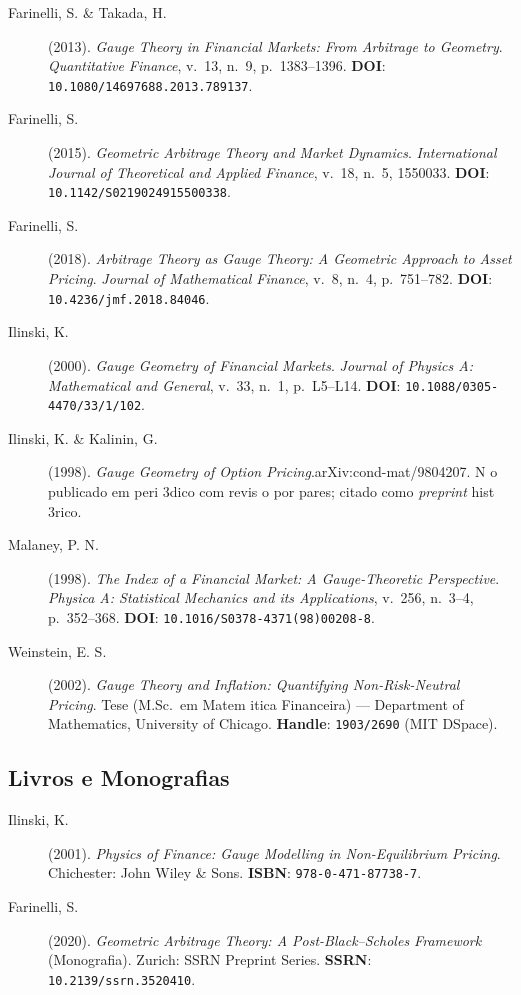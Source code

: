 \begin{description}
\item[Farinelli, S. \& Takada, H.] (2013). \textit{Gauge Theory in Financial Markets: From Arbitrage to Geometry}. \textit{Quantitative Finance}, v.~13, n.~9, p.~1383--1396. \textbf{DOI}: \texttt{10.1080/14697688.2013.789137}.

\item[Farinelli, S.] (2015). \textit{Geometric Arbitrage Theory and Market Dynamics}. \textit{International Journal of Theoretical and Applied Finance}, v.~18, n.~5, 1550033. \textbf{DOI}: \texttt{10.1142/S0219024915500338}.

\item[Farinelli, S.] (2018). \textit{Arbitrage Theory as Gauge Theory: A Geometric Approach to Asset Pricing}. \textit{Journal of Mathematical Finance}, v.~8, n.~4, p.~751--782. \textbf{DOI}: \texttt{10.4236/jmf.2018.84046}.

\item[Ilinski, K.] (2000). \textit{Gauge Geometry of Financial Markets}. \textit{Journal of Physics A: Mathematical and General}, v.~33, n.~1, p.~L5--L14. \textbf{DOI}: \texttt{10.1088/0305-4470/33/1/102}.

\item[Ilinski, K. \& Kalinin, G.] (1998). \textit{Gauge Geometry of Option Pricing}.arXiv:cond-mat/9804207. N o publicado em peri 3dico com revis o por pares; citado como \textit{preprint} hist 3rico.

\item[Malaney, P. N.] (1998). \textit{The Index of a Financial Market: A Gauge-Theoretic Perspective}. \textit{Physica A: Statistical Mechanics and its Applications}, v.~256, n.~3--4, p.~352--368. \textbf{DOI}: \texttt{10.1016/S0378-4371(98)00208-8}.

\item[Weinstein, E. S.] (2002). \textit{Gauge Theory and Inflation: Quantifying Non-Risk-Neutral Pricing}. Tese (M.Sc.\ em Matem itica Financeira) --- Department of Mathematics, University of Chicago. \textbf{Handle}: \texttt{1903/2690} (MIT DSpace).
\end{description}

\subsection{Livros e Monografias}

\begin{description}
\item[Ilinski, K.] (2001). \textit{Physics of Finance: Gauge Modelling in Non-Equilibrium Pricing}. Chichester: John Wiley \& Sons. \textbf{ISBN}: \texttt{978-0-471-87738-7}.

\item[Farinelli, S.] (2020). \textit{Geometric Arbitrage Theory: A Post-Black--Scholes Framework} (Monografia). Zurich: SSRN Preprint Series. \textbf{SSRN}: \texttt{10.2139/ssrn.3520410}.
\end{description}

